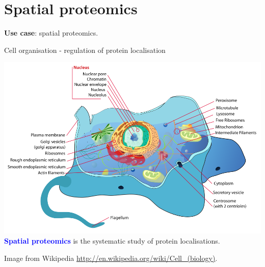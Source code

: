 \section{Spatial proteomics}

\begin{frame}{}
  \begin{center}
    \Large{\textbf{Use case}: spatial proteomics.}
  \end{center}
\end{frame}


\begin{frame}{Cell organisation - regulation of protein localisation}
  \begin{center}
    \includegraphics[width=1\linewidth]{figs_all/Animal_cell_structure.png} \\
    \textbf{\textcolor{Blue}{Spatial proteomics}} is the systematic
    study of protein localisations.
  \end{center}

  \tiny Image from Wikipedia
  \url{http://en.wikipedia.org/wiki/Cell_(biology)}.
\end{frame}


